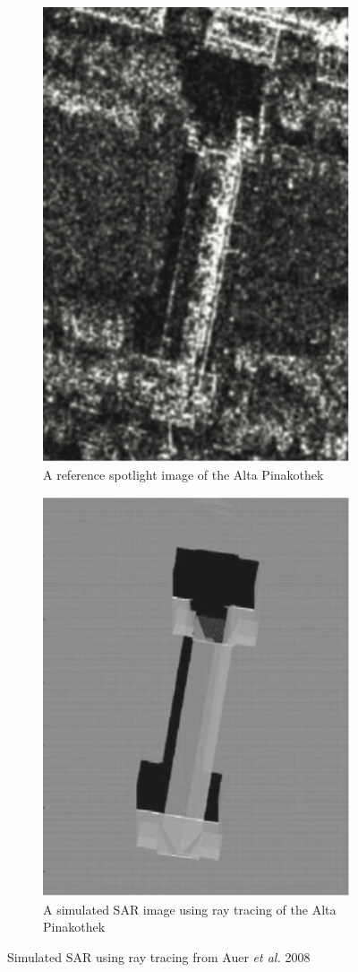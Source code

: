\begin{figure}
\centering
\begin{subfigure}{.5\textwidth}
	\centering
	\includegraphics[width=0.7\linewidth]{../figures/auer_2008_terrasar_ref}
	\caption{A reference spotlight image of the Alta Pinakothek}
	\label{fig:auer_2008_ref}
\end{subfigure}%
\begin{subfigure}{.5\textwidth}
	\centering
	\includegraphics[width=0.7\linewidth]{../figures/auer_2008_all_reflections}	
	\caption{A simulated SAR image using ray tracing of the Alta Pinakothek}
	\label{fig:auer_2008_all}
\end{subfigure}
\caption{Simulated SAR using ray tracing from Auer \textit{et al.} 2008 \cite{auerRayTracingSimulating2008}}
\label{fig:auer_2008_ray_tracing}
	
\end{figure}


